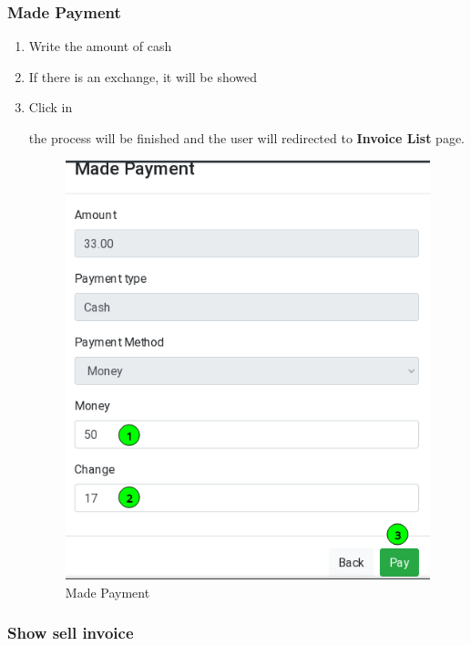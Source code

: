 \documentclass[a4paper,11pt]{refart}
\begin{document}
\subsubsection{Made Payment}
\begin{enumerate}
	\item Write the amount of cash 
	\item If there is an exchange, it will be showed
	\item Click in 
	\medskip
	\begin{leftbar}
		the process will be finished and the user will redirected to \textbf{Invoice List} page.
	\end{leftbar}
	\begin{figure}[H]\centering
		\includegraphics[width=\textwidth]{images/sellinvoice-7}
		\caption{Made Payment}\label{fig:sellinvoice-7}
	\end{figure}
\end{enumerate}

\subsubsection{Show sell invoice}
\end{document}
